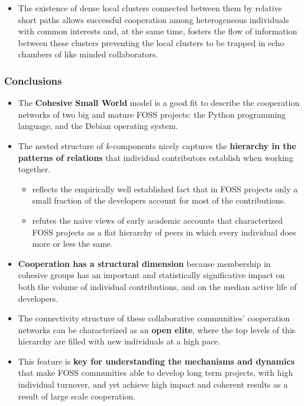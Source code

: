 \documentclass[ignorenonframetext,red,8pt,notes=hide]{beamer}
\begin{document}
\begin{frame}
{\begin{itemize}
\item The existence of dense local clusters connected between them by relative short paths allows successful cooperation among heterogeneous individuals with common interests and, at the same time, fosters the flow of information between these clusters preventing the local clusters to be trapped in echo chambers of like minded collaborators.
\end{itemize}
}

\end{frame}



\begin{frame}
\frametitle{Conclusions}

\begin{itemize}

\item The \textbf{Cohesive Small World} model is a good fit to describe the cooperation networks of two big and mature FOSS projects: the Python programming language, and the Debian operating system.

\item The nested structure of $k$-components nicely captures the \textbf{hierarchy in the patterns of relations} that individual contributors establish when working together.

\begin{itemize}
\item reflects the empirically well established fact that in FOSS projects only a small fraction of the developers account for most of the contributions.

\item refutes the naive views of early academic accounts that characterized FOSS projects as a flat hierarchy of peers in which every individual does more or less the same.
\end{itemize}

\item \textbf{Cooperation has a structural dimension} because membership in cohesive groups has an important and statistically significative impact on both the volume of individual contributions, and on the median active life of developers.

\item The connectivity structure of these collaborative communities' cooperation networks can be characterized as an \textbf{open elite}, where the top levels of this hierarchy are filled with new individuals at a high pace. 

\item This feature is \textbf{key for understanding the mechanisms and dynamics} that make FOSS communities able to develop long term projects, with high individual turnover, and yet achieve high impact and coherent results as a result of large scale cooperation.

\end{itemize}

\end{frame}
\end{document}
